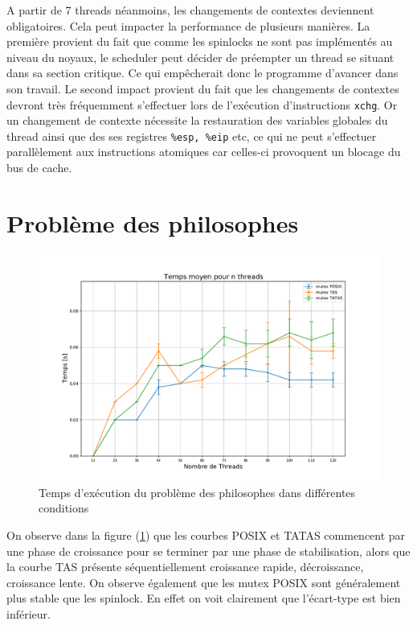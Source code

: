 \noindent A partir de 7 threads néanmoins, les changements de contextes deviennent obligatoires. Cela peut impacter la performance de plusieurs manières. La première provient du fait que comme les spinlocks ne sont pas implémentés au niveau du noyaux, le scheduler peut décider de préempter un thread se situant dans sa section critique. Ce qui empêcherait donc le programme d'avancer dans son travail. Le second impact provient du fait que les changements de contextes devront très fréquemment s'effectuer lors de l'exécution d'instructions \texttt{xchg}. Or un changement de contexte nécessite la restauration des variables globales du thread ainsi que des ses registres \texttt{\%esp, \%eip} etc, ce qui ne peut s'effectuer parallèlement aux instructions atomiques car celles-ci provoquent un blocage du bus de cache.

\section{Problème des philosophes}

\begin{figure}[H]
    \centering
    \includegraphics[scale=0.4]{img/philosophes.pdf}
    \caption{Temps d'exécution du problème des philosophes dans différentes conditions}
    \label{pic:philo}
\end{figure}

\noindent On observe dans la figure (\ref{pic:philo}) que les courbes POSIX et TATAS commencent par une phase de croissance pour se terminer par une phase de stabilisation, alors que la courbe TAS présente séquentiellement croissance rapide, décroissance, croissance lente.
On observe également que les mutex POSIX sont généralement plus stable que les spinlock. En effet on voit clairement que l'écart-type est bien inférieur. \\


